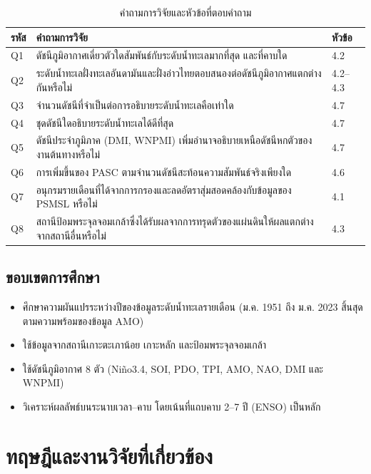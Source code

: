 \documentclass[a4paper,11pt]{article}
\begin{document}
\begin{table}[H]
\caption{คำถามการวิจัยและหัวข้อที่ตอบคำถาม}\label{tab:rq}
\centering\small
\begin{tabularx}{\textwidth}{@{}l Y l@{}}
\toprule
\textbf{รหัส} & \textbf{คำถามการวิจัย} & \textbf{หัวข้อ} \\
\midrule
Q1 & ดัชนีภูมิอากาศเดี่ยวตัวใดสัมพันธ์กับระดับน้ำทะเลมากที่สุด และที่คาบใด & 4.2 \\
Q2 & ระดับน้ำทะเลฝั่งทะเลอันดามันและฝั่งอ่าวไทยตอบสนองต่อดัชนีภูมิอากาศแตกต่างกันหรือไม่ & 4.2–4.3 \\
Q3 & จำนวนดัชนีที่จำเป็นต่อการอธิบายระดับน้ำทะเลคือเท่าใด & 4.7 \\
Q4 & ชุดดัชนีใดอธิบายระดับน้ำทะเลได้ดีที่สุด & 4.7 \\
Q5 & ดัชนีประจำภูมิภาค (DMI, WNPMI) เพิ่มอำนาจอธิบายเหนือดัชนีหกตัวของงานต้นทางหรือไม่ & 4.7 \\
Q6 & การเพิ่มขึ้นของ PASC ตามจำนวนดัชนีสะท้อนความสัมพันธ์จริงเพียงใด & 4.6 \\
Q7 & อนุกรมรายเดือนที่ได้จากการกรองและลดอัตราสุ่มสอดคล้องกับข้อมูลของ PSMSL หรือไม่ & 4.1 \\
Q8 & สถานีป้อมพระจุลจอมเกล้าซึ่งได้รับผลจากการทรุดตัวของแผ่นดินให้ผลแตกต่างจากสถานีอื่นหรือไม่ & 4.3 \\
\bottomrule
\end{tabularx}
\end{table}

\subsection{ขอบเขตการศึกษา}

\begin{itemize}
  \item ศึกษาความผันแปรระหว่างปีของข้อมูลระดับน้ำทะเลรายเดือน (ม.ค. 1951 ถึง ม.ค. 2023 สิ้นสุดตามความพร้อมของข้อมูล AMO)
  \item ใช้ข้อมูลจากสถานีเกาะตะเภาน้อย เกาะหลัก และป้อมพระจุลจอมเกล้า
  \item ใช้ดัชนีภูมิอากาศ 8 ตัว (Niño3.4, SOI, PDO, TPI, AMO, NAO, DMI และ WNPMI)
  \item วิเคราะห์ผลลัพธ์บนระนาบเวลา–คาบ โดยเน้นที่แถบคาบ 2–7 ปี (ENSO) เป็นหลัก
\end{itemize}

\section{ทฤษฎีและงานวิจัยที่เกี่ยวข้อง}
\end{document}
